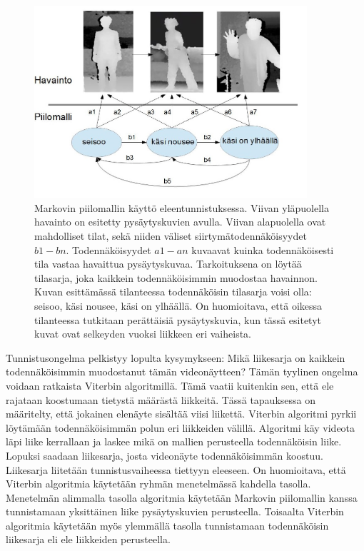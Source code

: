 \begin{figure}[htb]
  \begin{center}
    \includegraphics[width=0.9\textwidth]{HMModfcropped.jpg}
    \caption{Markovin piilomallin käyttö eleentunnistuksessa. Viivan yläpuolella havainto on esitetty pysäytyskuvien avulla. Viivan alapuolella
	ovat mahdolliset tilat,	sekä niiden väliset siirtymätodennäköisyydet $b1-bn$. Todennäköisyydet $a1-an$ kuvaavat kuinka todennäköisesti tila 
	vastaa havaittua pysäytyskuvaa.
	Tarkoituksena on löytää tilasarja, joka kaikkein todennäköisimmin muodostaa havainnon. Kuvan esittämässä tilanteessa todennäköisin tilasarja
	voisi olla: seisoo, käsi nousee, käsi on ylhäällä. On huomioitava, että oikessa tilanteessa tutkitaan perättäisiä pysäytyskuvia, kun
	tässä esitetyt kuvat ovat selkeyden vuoksi liikkeen eri vaiheista.}
    \label{fig:HMM}
  \end{center}
\end{figure}

Tunnistusongelma pelkistyy lopulta kysymykseen: Mikä liikesarja on kaikkein todennäköisimmin muodostanut tämän videonäytteen?
Tämän tyylinen ongelma voidaan ratkaista Viterbin algoritmillä. Tämä vaatii kuitenkin sen, että ele rajataan koostumaan tietystä määrästä liikkeitä.
Tässä tapauksessa on määritelty, että jokainen elenäyte sisältää viisi liikettä.
Viterbin algoritmi pyrkii löytämään todennäköisimmän polun eri liikkeiden välillä. Algoritmi käy videota läpi liike kerrallaan ja laskee mikä
on mallien perusteella todennäköisin liike. Lopuksi saadaan liikesarja, josta videonäyte todennäköisimmän koostuu.
Liikesarja liitetään tunnistusvaiheessa tiettyyn eleeseen. On huomioitava, että Viterbin algoritmia käytetään ryhmän menetelmässä 
kahdella tasolla. Menetelmän alimmalla tasolla algoritmia käytetään Markovin piilomallin kanssa tunnistamaan yksittäinen liike pysäytyskuvien perusteella. 
Toisaalta Viterbin algoritmia käytetään myös ylemmällä tasolla tunnistamaan todennäköisin liikesarja eli ele liikkeiden perusteella. \citep {6239185}\\

